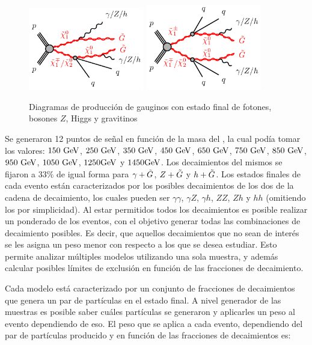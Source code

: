 \begin{figure}
  \centering
  \includegraphics[width=0.45\textwidth]{images/analysis_EWK/N1N2C1-qqZhphGG-GGM.pdf}%
  \includegraphics[width=0.45\textwidth]{images/analysis_EWK/C1C1N2-qqqqZhphGG-GGM.pdf}
  \caption{Diagramas de producción de gauginos con estado final de fotones, bosones $Z$, Higgs y gravitinos}
  \label{fig:EWK_GGM_diagrams}
\end{figure}


Se generaron 12 puntos de señal en función de la masa del \ninoone, la cual podía tomar los valores: $150\ \text{GeV}$, $250\ \text{GeV}$, $350\ \text{GeV}$, $450\ \gev$, $650\ \text{GeV}$, $750\ \text{GeV}$, $850\ \gev$, $950\ \text{GeV}$, $1050\ \text{GeV}$, $1250 \text{GeV}$ y $1450 \text{GeV}$. Los decaimientos del mismos se fijaron a $33\%$ de igual forma para $\gamma + \tilde{G}$, $Z + \tilde{G}$ y $h + \tilde{G}$. Los estados finales de cada evento están caracterizados por los posibles decaimientos de los dos \ninoone de la cadena de decaimiento, los cuales pueden ser $\gamma\gamma$, $\gamma Z$, $\gamma h$, $ZZ$, $Zh$ y $hh$ (omitiendo los \gravino por simplicidad). Al estar permitidos todos los decaimientos es posible realizar un ponderado de los eventos, con el objetivo generar todas las combinaciones de decaimiento posibles. Es decir, que aquellos decaimientos que no sean de interés se les asigna un peso menor con respecto a los que se desea estudiar. Esto permite analizar múltiples modelos utilizando una sola muestra, y además calcular posibles límites de exclusión en función de las fracciones de decaimiento.

Cada modelo está caracterizado por un conjunto de fracciones de decaimientos que genera un par de partículas en el estado final. A nivel generador de las muestras es posible saber cuáles partículas se generaron y aplicarles un peso al evento dependiendo de eso. El peso que se aplica a cada evento, dependiendo del par de partículas producido y en función de las fracciones de decaimientos es:


